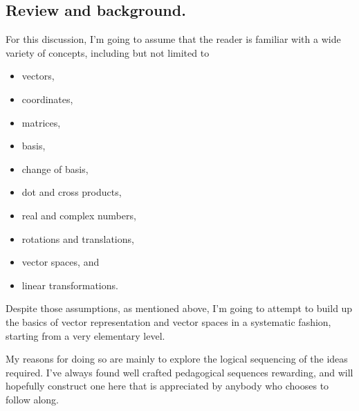 \subsection{Review and background.}
For this discussion, I'm going to assume that the reader is familiar with a wide variety of concepts, including but not limited to
\begin{itemize}
\item vectors,
\item coordinates,
\item matrices,
\item basis,
\item change of basis,
\item dot and cross products,
\item real and complex numbers,
\item rotations and translations,
\item vector spaces, and
\item linear transformations.
\end{itemize}
Despite those assumptions, as mentioned above, I'm going to attempt to build up the basics of vector representation and vector spaces in a systematic fashion, starting from a very elementary level.

My reasons for doing so are mainly to explore the logical sequencing of the ideas required.
I've always found well crafted pedagogical sequences rewarding, and will hopefully construct one here that is appreciated by anybody who chooses to follow along.
